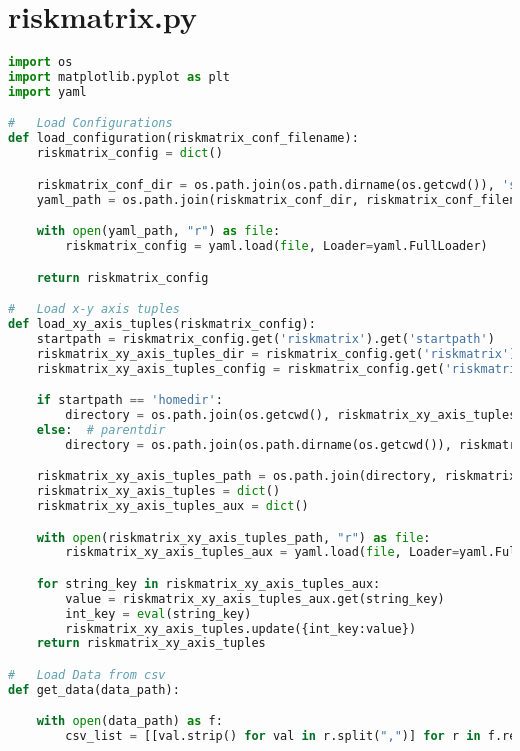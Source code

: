 
\section{riskmatrix.py}
\lstset{style=gra_codestyle}
\begin{lstlisting}[language=python, caption=Python LaTex - riskmatrix.py - Risxikomatrizen,captionpos=b,label={lst:riskmatrix},breaklines=true]
import os
import matplotlib.pyplot as plt
import yaml

#   Load Configurations
def load_configuration(riskmatrix_conf_filename):
    riskmatrix_config = dict()

    riskmatrix_conf_dir = os.path.join(os.path.dirname(os.getcwd()), 'source', 'configuration')
    yaml_path = os.path.join(riskmatrix_conf_dir, riskmatrix_conf_filename)

    with open(yaml_path, "r") as file:
        riskmatrix_config = yaml.load(file, Loader=yaml.FullLoader)

    return riskmatrix_config

#   Load x-y axis tuples
def load_xy_axis_tuples(riskmatrix_config):
    startpath = riskmatrix_config.get('riskmatrix').get('startpath')
    riskmatrix_xy_axis_tuples_dir = riskmatrix_config.get('riskmatrix').get('configfile_path')
    riskmatrix_xy_axis_tuples_config = riskmatrix_config.get('riskmatrix').get('configfile_name')

    if startpath == 'homedir':
        directory = os.path.join(os.getcwd(), riskmatrix_xy_axis_tuples_dir)
    else:  # parentdir
        directory = os.path.join(os.path.dirname(os.getcwd()), riskmatrix_xy_axis_tuples_dir)

    riskmatrix_xy_axis_tuples_path = os.path.join(directory, riskmatrix_xy_axis_tuples_config)
    riskmatrix_xy_axis_tuples = dict()
    riskmatrix_xy_axis_tuples_aux = dict()

    with open(riskmatrix_xy_axis_tuples_path, "r") as file:
        riskmatrix_xy_axis_tuples_aux = yaml.load(file, Loader=yaml.FullLoader)

    for string_key in riskmatrix_xy_axis_tuples_aux:
        value = riskmatrix_xy_axis_tuples_aux.get(string_key)
        int_key = eval(string_key)
        riskmatrix_xy_axis_tuples.update({int_key:value})
    return riskmatrix_xy_axis_tuples

#   Load Data from csv
def get_data(data_path):

    with open(data_path) as f:
        csv_list = [[val.strip() for val in r.split(",")] for r in f.readlines()]


\end{lstlisting}
